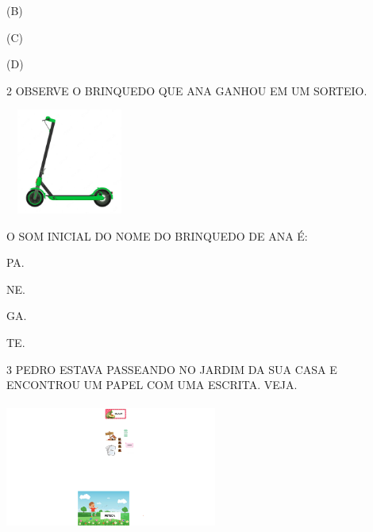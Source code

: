(B)

(C)

(D)



\num{2} OBSERVE O BRINQUEDO QUE ANA GANHOU EM UM SORTEIO.

\includegraphics[width=1.65484in,height=1.36089in]{media/image83.png}

O SOM INICIAL DO NOME DO BRINQUEDO DE ANA É:

\begin{escolha}
\item PA.

\item NE.

\item GA.

\item TE.
\end{escolha}




\num{3} PEDRO ESTAVA PASSEANDO NO JARDIM DA SUA CASA E ENCONTROU UM PAPEL COM UMA ESCRITA. VEJA.

\includegraphics[width=2.73976in,height=1.64660in]{media/image84.png}

